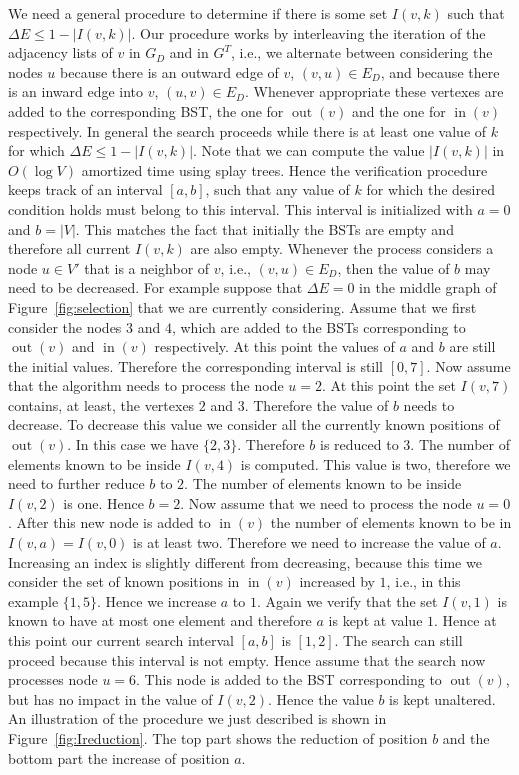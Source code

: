 \documentclass[a4paper]{article}
\DeclareMathOperator{\inn}{in}
\DeclareMathOperator{\out}{out}
\begin{document}
We need a general procedure to determine if there is some set $I(v, k)$
such that $\Delta E \leq 1 - |I(v, k)|$. Our procedure works by
interleaving the iteration of the adjacency lists of $v$ in $G_D$ and in
$G^T$, i.e., we alternate between considering the nodes $u$ because there
is an outward edge of $v$, $(v, u) \in E_D$, and because there is an inward
edge into $v$, $(u, v) \in E_D$. Whenever appropriate these vertexes are
added to the corresponding BST, the one for $\out(v)$ and the one for
$\inn(v)$ respectively. In general the search proceeds while there is at
least one value of $k$ for which $\Delta E \leq 1 - |I(v, k)|$. Note that
we can compute the value $|I(v, k)|$ in $O(\log V)$ amortized time using
splay trees. Hence the verification procedure keeps track of an interval
$[a,b]$, such that any value of $k$ for which the desired condition holds
must belong to this interval. This interval is initialized with $a = 0$ and
$b = |V|$. This matches the fact that initially the BSTs are empty and
therefore all current $I(v, k)$ are also empty. Whenever the process
considers a node $u \in V'$ that is a neighbor of $v$, i.e.,
$(v, u) \in E_D$, then the value of $b$ may need to be decreased. For
example suppose that $\Delta E = 0$ in the middle graph of
Figure~\ref{fig:selection} that we are currently considering. Assume that
we first consider the nodes $3$ and $4$, which are added to the BSTs
corresponding to $\out(v)$ and $\inn(v)$ respectively. At this point the
values of $a$ and $b$ are still the initial values. Therefore the
corresponding interval is still $[0, 7]$. Now assume that the algorithm
needs to process the node $u = 2$. At this point the set $I(v, 7)$
contains, at least, the vertexes $2$ and $3$. Therefore the value of $b$
needs to decrease. To decrease this value we consider all the currently
known positions of $\out(v)$. In this case we have $\{ 2, 3\}$. Therefore
$b$ is reduced to $3$. The number of elements known to be inside $I(v, 4)$
is computed. This value is two, therefore we need to further reduce $b$ to
$2$. The number of elements known to be inside $I(v, 2)$ is one. Hence
$b = 2$. Now assume that we need to process the node $u = 0$. After this
new node is added to $\inn(v)$ the number of elements known to be in
$I(v,a) = I(v, 0)$ is at least two. Therefore we need to increase the value
of $a$. Increasing an index is slightly different from decreasing, because
this time we consider the set of known positions in $\inn(v)$ increased by
$1$, i.e., in this example $\{1, 5\}$. Hence we increase $a$ to $1$. Again
we verify that the set $I(v, 1)$ is known to have at most one element and
therefore $a$ is kept at value $1$. Hence at this point our current search
interval $[a,b]$ is $[1,2]$. The search can still proceed because this
interval is not empty. Hence assume that the search now processes node
$u = 6$. This node is added to the BST corresponding to $\out(v)$, but has
no impact in the value of $I(v, 2)$. Hence the value $b$ is kept
unaltered. An illustration of the procedure we just described is shown in
Figure~\ref{fig:Ireduction}. The top part shows the reduction of position
$b$ and the bottom part the increase of position $a$.
\end{document}
